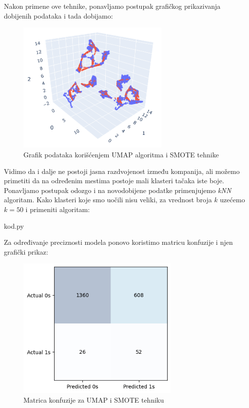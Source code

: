 \documentclass[12pt]{article}
\theoremstyle{definition}
\theoremstyle{remark}
\begin{document}
\hfill

Nakon primene ove tehnike, ponavljamo postupak grafičkog prikazivanja dobijenih podataka i tada dobijamo:

\begin{figure}[htp]
    \centering
    \includegraphics[width=7.5cm]{drugi3dgrafik.png}
    \caption{Grafik podataka korišćenjem UMAP algoritma i SMOTE tehnike}
    \label{fig:galaxy}
\end{figure}
\newpage

Vidimo da i dalje ne postoji jasna razdvojenost između kompanija, ali možemo primetiti da na određenim mestima postoje mali klasteri tačaka iste boje. Ponavljamo postupak odozgo i na novodobijene podatke primenjujemo \emph{kNN} algoritam. Kako klasteri koje smo uočili nisu veliki, za vrednost broja $k$ uzećemo $k=50$ i primeniti algoritam:

\hfill

{kod.py}

\hfill

Za određivanje preciznosti modela ponovo koristimo matricu konfuzije i njen grafički prikaz:

\begin{figure}[htp]
    \centering
    \includegraphics[width=8cm]{output_55_0.png}
    \caption{Matrica konfuzije za UMAP i SMOTE tehniku}
    \label{fig:galaxy}
\end{figure}
\end{document}
